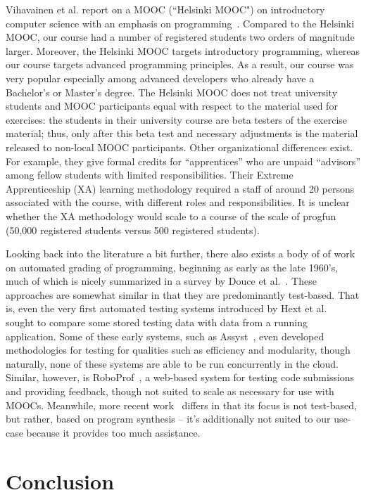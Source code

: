 \documentclass{sig-alternate}
\begin{document}
Vihavainen et al. report on a MOOC (``Helsinki MOOC") on introductory computer
science with an emphasis on programming~\cite{VihavainenLK12}. Compared to the
Helsinki MOOC, our course had a number of registered students two orders of
magnitude larger. Moreover, the Helsinki MOOC targets introductory
programming, whereas our course targets advanced programming principles. As a
result, our course was very popular especially among advanced developers who
already have a Bachelor's or Master's degree. The Helsinki MOOC does not treat
university students and MOOC participants equal with respect to the material
used for exercises: the students in their university course are beta testers
of the exercise material; thus, only after this beta test and necessary
adjustments is the material released to non-local MOOC participants. Other
organizational differences exist. For example, they give formal credits for
``apprentices'' who are unpaid ``advisors'' among fellow students with limited
responsibilities. Their Extreme Apprenticeship (XA) learning methodology
required a staff of around 20 persons associated with the course, with
different roles and responsibilities. It is unclear whether the XA methodology
would scale to a course of the scale of progfun (50,000 registered students
versus 500 registered students).

Looking back into the literature a bit further, there also exists a body of
of work on automated grading of programming, beginning as early as the late 1960's,
much of which is nicely summarized in a survey by Douce et al.~\cite{Douce}. These approaches
are somewhat similar in that they are predominantly test-based. That is, even the very
first automated testing systems introduced by Hext et al.~\cite{Hext69} sought to compare
some stored testing data with data from a running application. Some of these early systems,
such as Assyst~\cite{Assyst}, even developed methodologies for testing for qualities such as
efficiency and modularity, though naturally, none of these systems are able to be run
concurrently in the cloud. Similar, however, is RoboProf~\cite{RoboProf}, a web-based system for
testing code submissions and providing feedback, though not suited to scale as necessary for use with MOOCs.
Meanwhile, more recent work~\cite{PLDI13} differs in that its focus is not test-based, but
rather, based on program synthesis – it's additionally not suited to our use-case because it
provides too much assistance.

\section{Conclusion}
\label{sec:conclusion}


%

%
%
\end{document}
